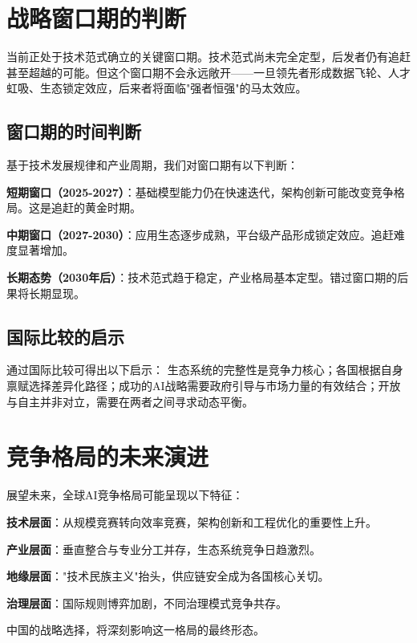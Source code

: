\section{战略窗口期的判断}

当前正处于技术范式确立的关键窗口期。技术范式尚未完全定型，后发者仍有追赶甚至超越的可能。但这个窗口期不会永远敞开——一旦领先者形成数据飞轮、人才虹吸、生态锁定效应，后来者将面临"强者恒强"的马太效应。

\subsection{窗口期的时间判断}

基于技术发展规律和产业周期，我们对窗口期有以下判断：

\textbf{短期窗口（2025-2027）}：基础模型能力仍在快速迭代，架构创新可能改变竞争格局。这是追赶的黄金时期。

\textbf{中期窗口（2027-2030）}：应用生态逐步成熟，平台级产品形成锁定效应。追赶难度显著增加。

\textbf{长期态势（2030年后）}：技术范式趋于稳定，产业格局基本定型。错过窗口期的后果将长期显现。

\subsection{国际比较的启示}

通过国际比较可得出以下启示：
生态系统的完整性是竞争力核心；各国根据自身禀赋选择差异化路径；成功的AI战略需要政府引导与市场力量的有效结合；开放与自主并非对立，需要在两者之间寻求动态平衡。

\section{竞争格局的未来演进}

展望未来，全球AI竞争格局可能呈现以下特征：

\textbf{技术层面}：从规模竞赛转向效率竞赛，架构创新和工程优化的重要性上升。

\textbf{产业层面}：垂直整合与专业分工并存，生态系统竞争日趋激烈。

\textbf{地缘层面}："技术民族主义"抬头，供应链安全成为各国核心关切。

\textbf{治理层面}：国际规则博弈加剧，不同治理模式竞争共存。

中国的战略选择，将深刻影响这一格局的最终形态。
